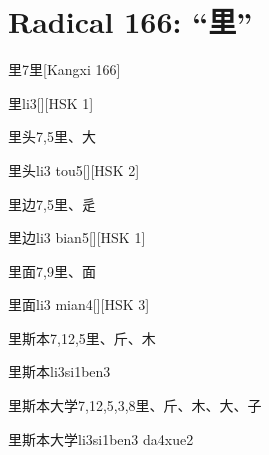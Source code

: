 
\section*{Radical 166: ``⾥''}

\begin{Entry}{里}{7}{⾥}[Kangxi 166]
  \begin{Phonetics}{里}{li3}[][HSK 1]
  \end{Phonetics}
\end{Entry}

\begin{Entry}{里头}{7,5}{⾥、⼤}
  \begin{Phonetics}{里头}{li3 tou5}[][HSK 2]
  \end{Phonetics}
\end{Entry}

\begin{Entry}{里边}{7,5}{⾥、⾡}
  \begin{Phonetics}{里边}{li3 bian5}[][HSK 1]
  \end{Phonetics}
\end{Entry}

\begin{Entry}{里面}{7,9}{⾥、⾯}
  \begin{Phonetics}{里面}{li3 mian4}[][HSK 3]
  \end{Phonetics}
\end{Entry}

\begin{Entry}{里斯本}{7,12,5}{⾥、⽄、⽊}
  \begin{Phonetics}{里斯本}{li3si1ben3}
  \end{Phonetics}
\end{Entry}

\begin{Entry}{里斯本大学}{7,12,5,3,8}{⾥、⽄、⽊、⼤、⼦}
  \begin{Phonetics}{里斯本大学}{li3si1ben3 da4xue2}
  \end{Phonetics}
\end{Entry}

